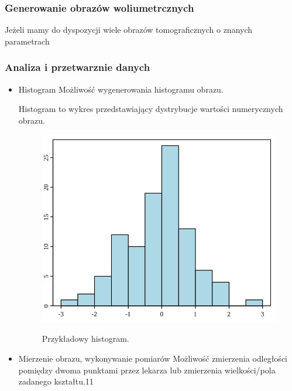\subsubsection{Generowanie obrazów woliumetrcznych}

Jeżeli mamy do dyspozycji wiele obrazów tomograficznych o znanych parametrach

\subsubsection{Analiza i przetwarznie danych}

\begin{itemize}
    \item Histogram
          Możliwość wygenerowania histogramu obrazu.

          Histogram to wykres przedstawiający dystrybucje wartości numerycznych obrazu.


          \begin{figure}[!htbp]
            \caption{Przykładowy histogram.}
            \includegraphics[width=\textwidth]{img/wyswietlanie002.svg}
            \centering
            \label{fig:wyswietlanie002}
        \end{figure}

    \item Mierzenie obrazu, wykonywanie pomiarów
          Możliwość zmierzenia odległości pomiędzy dwoma punktami przez lekarza lub zmierzenia wielkości/pola zadanego kształtu.11
\end{itemize}

